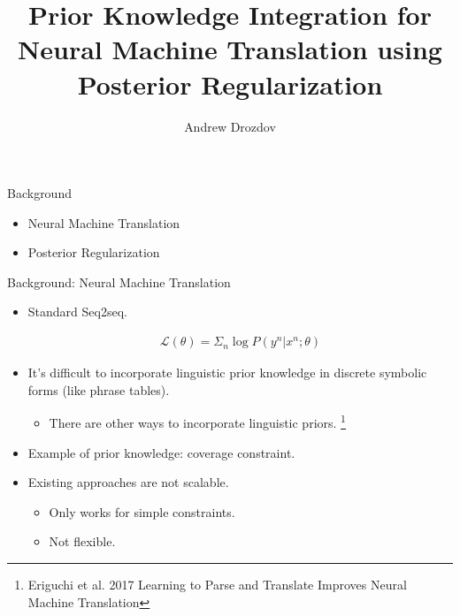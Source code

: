 \documentclass{beamer}
\title[Posterior Regularization]{Prior Knowledge Integration for Neural Machine Translation using Posterior Regularization}
\author{Andrew Drozdov}
\begin{document}
\begin{frame}
  \titlepage
\end{frame}
%

\begin{frame}{Background}{}
\begin{itemize}
\item Neural Machine Translation
\item Posterior Regularization
\end{itemize}
\end{frame}

\begin{frame}{Background: Neural Machine Translation}{}
\begin{itemize}
\item Standard Seq2seq.

\begin{align*}
\mathcal{L}(\theta) = \Sigma_n \log P(y^n|x^n;\theta)
\end{align*}

\item It's difficult to incorporate linguistic prior knowledge in discrete symbolic forms (like phrase tables).
\begin{itemize}
\item There are other ways to incorporate linguistic priors. \footnote[frame]{Eriguchi et al. 2017 Learning to Parse and Translate Improves Neural Machine Translation}
\end{itemize}

\item Example of prior knowledge: coverage constraint.

\item Existing approaches are not scalable.
\begin{itemize}
\item Only works for simple constraints.
\item Not flexible.
\end{itemize}
\end{itemize}

\end{frame}
\end{document}
